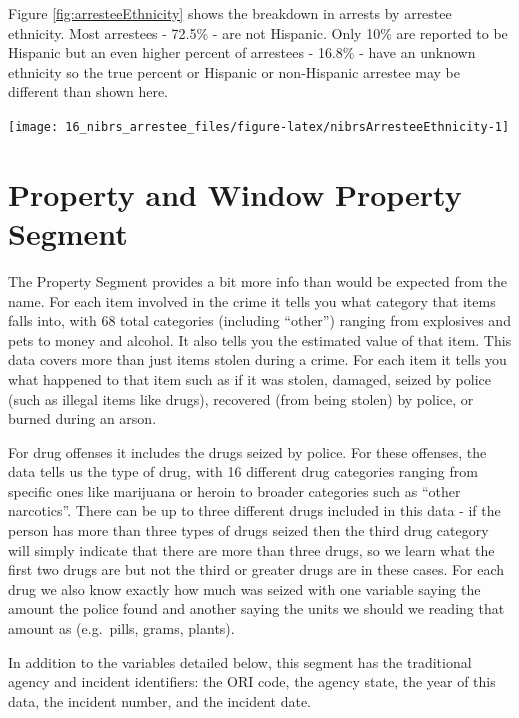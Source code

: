 \documentclass[
]{krantz}
\let\origfigure\figure
\let\endorigfigure\endfigure
\renewenvironment{figure}[1][2] {
    \expandafter\origfigure\expandafter[H]
} {
    \endorigfigure
}
\begin{document}
Figure \ref{fig:arresteeEthnicity} shows the breakdown in
arrests by arrestee ethnicity. Most arrestees - 72.5\% - are
not Hispanic. Only 10\% are reported to be Hispanic but an
even higher percent of arrestees - 16.8\% - have an unknown
ethnicity so the true percent or Hispanic or non-Hispanic
arrestee may be different than shown here.

\begin{figure}

{\centering \texttt{[image: 16\_nibrs\_arrestee\_files/figure-latex/nibrsArresteeEthnicity-1]} 

}

\caption{The share of arrestees by ethnicity, 1991-2022.}\label{fig:nibrsArresteeEthnicity}
\end{figure}

\chapter{Property and Window Property
Segment}\label{property}

The Property Segment provides a bit more info than would be
expected from the name. For each item involved in the crime
it tells you what category that items falls into, with 68
total categories (including ``other'') ranging from
explosives and pets to money and alcohol. It also tells you
the estimated value of that item. This data covers more than
just items stolen during a crime. For each item it tells you
what happened to that item such as if it was stolen,
damaged, seized by police (such as illegal items like
drugs), recovered (from being stolen) by police, or burned
during an arson.

For drug offenses it includes the drugs seized by police.
For these offenses, the data tells us the type of drug, with
16 different drug categories ranging from specific ones like
marijuana or heroin to broader categories such as ``other
narcotics''. There can be up to three different drugs
included in this data - if the person has more than three
types of drugs seized then the third drug category will
simply indicate that there are more than three drugs, so we
learn what the first two drugs are but not the third or
greater drugs are in these cases. For each drug we also know
exactly how much was seized with one variable saying the
amount the police found and another saying the units we
should we reading that amount as (e.g.~pills, grams,
plants).

In addition to the variables detailed below, this segment
has the traditional agency and incident identifiers: the ORI
code, the agency state, the year of this data, the incident
number, and the incident date.
\end{document}
